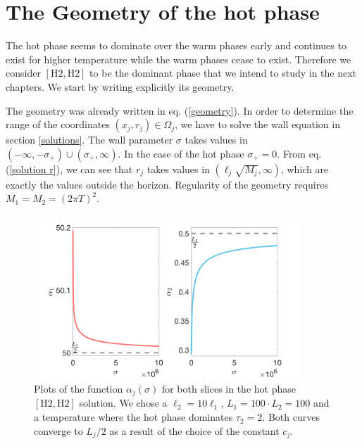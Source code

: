 \section{The Geometry of the hot phase}
The hot phase seems to dominate over the warm phases early and continues to exist for higher temperature while the warm phases cease to exist. Therefore we consider $\left[\text{H}2,\text{H}2\right]$ to be the dominant phase that we intend to study in the next chapters. We start by writing explicitly its geometry.

The geometry was already written in eq. (\ref{geometry}). In order to determine the range of the coordinates $\left(x_j,r_j\right)\in \Omega_j$, we have to solve the wall equation in section \ref{solutions}. The wall parameter $\sigma$ takes values in $(-\infty,-\sigma_+)\cup(\sigma_+, \infty)$. In the case of the hot phase $\sigma_+=0$. From eq. (\ref{solution r}), we can see that $r_j$ takes values in $(\ell_j\sqrt{M_j},\infty)$, which are exactly the values outside the horizon. Regularity of the geometry requires $M_1=M_2=(2\pi T)^2$.

\begin{figure}
    \centering
    \includegraphics[width=0.9\textwidth]{figures/alpha.png}
    \caption{Plots of the function $\alpha_j(\sigma)$ for both slices in the hot phase $\left[\text{H}2,\text{H}2\right]$ solution. We chose a $\ell_2=10\ell_1$, $L_1=100\cdot L_2=100$ and a temperature where the hot phase dominates $\tau_2=2$. Both curves converge to $L_j/2$ as a result of the choice of the constant $c_j$.}
    \label{alpha_sigma}
\end{figure}

